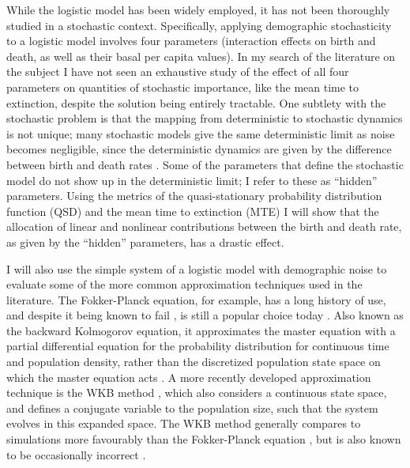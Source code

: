 While the logistic model has been widely employed, it has not been thoroughly studied in a stochastic context. 
Specifically, applying demographic stochasticity to a logistic model involves four parameters (interaction effects on birth and death, as well as their basal per capita values). 
In my search of the literature on the subject I have not seen an exhaustive study of the effect of all four parameters on quantities of stochastic importance, like the mean time to extinction, despite the solution being entirely tractable. 
%
One subtlety with the stochastic problem is that the mapping from deterministic to stochastic dynamics is not unique; many stochastic models give the same deterministic limit as noise becomes negligible, since the deterministic dynamics are given by the difference between birth and death rates \cite{Nisbet1982,Norden1982,Nasell2001,Rouzine2001,Gardiner2004a}. 
Some of the parameters that define the stochastic model do not show up in the deterministic limit; I refer to these as ``hidden'' parameters. 
Using the metrics of the quasi-stationary probability distribution function (QSD) and the mean time to extinction (MTE) I will show that the allocation of linear and nonlinear contributions between the birth and death rate, as given by the ``hidden'' parameters, has a drastic effect. %

I will also use the simple system of a logistic model with demographic noise to evaluate some of the more common approximation techniques used in the literature. 
The Fokker-Planck equation, for example, has a long history of use, and despite it being known to fail \cite{Grasman1983,Doering2005}, is still a popular choice today \cite{Kimura1955,Mangel1977,Roozen1987,Leigh1981,Lande1993,Foley1994,Traulsen2006,Parsons2007,Parsons2010,Chotibut2015,Constable2015,Lin2015,Iyer-Biswas2015,Yu2017,Young2018}. 
Also known as the backward Kolmogorov equation, it approximates the master equation with a partial differential equation for the probability distribution for continuous time and population density, rather than the discretized population state space on which the master equation acts \cite{Nisbet1982,Gardiner2004a}. 
A more recently developed approximation technique is the WKB method \cite{Doering2005,Assaf2006,Kessler2007,Ovaskainen2010,Assaf2016}, which also considers a continuous state space, and defines a conjugate variable to the population size, such that the system evolves in this expanded space. 
The WKB method generally compares to simulations more favourably than the Fokker-Planck equation \cite{Yu2017}, but is also known to be occasionally incorrect \cite{Assaf2010}. %

